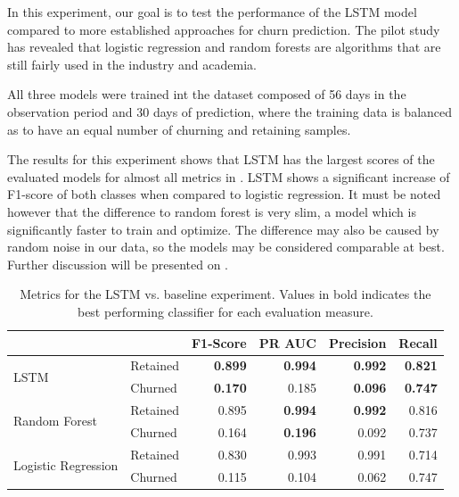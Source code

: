 \documentclass{kththesis}
\begin{document}
In this experiment, our goal is to test the performance of the LSTM model compared to more established approaches for churn prediction. The pilot study has revealed that logistic regression and random forests are algorithms that are still fairly used in the industry and academia.

All three models were trained int the dataset composed of 56 days in the observation period and 30 days of prediction, where the training data is balanced as to have an equal number of churning and retaining samples.

The results for this experiment shows that LSTM has the largest scores of the evaluated models for almost all metrics in . LSTM shows a significant increase of F1-score of both classes when compared to logistic regression. It must be noted however that the difference to random forest is very slim, a model which is significantly faster to train and optimize. The difference may also be caused by random noise in our data, so the models may be considered comparable at best. Further discussion will be presented on . 

\begin{table}[H]
\centering
\begin{tabular}{llrrrr}
\toprule
     &          &  F1-Score &    PR AUC &  Precision &    Recall \\
\midrule
\multirow{2}{*}{LSTM} & Retained &  \textbf{0.899} &  \textbf{0.994} &   \textbf{0.992} &  \textbf{0.821} \\
     & Churned &  \textbf{0.170} &  0.185 &   \textbf{0.096} &  \textbf{0.747} \\
\cline{1-6}
\multirow{2}{*}{Random Forest} & Retained &  0.895 &  \textbf{0.994} &   \textbf{0.992} &  0.816 \\
     & Churned &  0.164 &  \textbf{0.196} &   0.092 &  0.737 \\
\cline{1-6}
\multirow{2}{*}{Logistic Regression} & Retained &  0.830 &  0.993 &   0.991 &  0.714 \\
     & Churned &  0.115 &  0.104 &   0.062 &  0.747 \\
\bottomrule
\end{tabular}
\caption{Metrics for the LSTM vs. baseline experiment. Values in bold indicates the best performing classifier for each evaluation measure.}
\label{tab:temporal_static}
\end{table}
\end{document}

